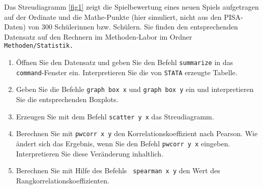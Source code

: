 \documentclass[11pt]{article}
\begin{document}
\begin{enumerate}
Das Streudiagramm \ref{fig1} zeigt die Spielbewertung eines neuen Spiels aufgetragen
auf der Ordinate und die Mathe-Punkte (hier simuliert, nicht aus den PISA-Daten)
von $300$ Schülerinnen bzw. Schülern. Sie finden den entsprechenden Datensatz
auf den Rechnern im Methoden-Labor im Ordner \texttt{Methoden/Statistik.}
 	\begin{enumerate}
 	\item{Öffnen Sie den Datensatz und geben Sie den Befehl \texttt{summarize} in das \texttt{command}-Fenster
 	ein. Interpretieren Sie die von \texttt{STATA} erzeugte Tabelle.}
 	\item{Geben Sie die Befehle \texttt{graph box x} und \texttt{graph box y} ein und interpretieren Sie
 	die entsprechenden Boxplots.}
 	\item{Erzeugen Sie mit dem Befehl \texttt{scatter y x} das Streudiagramm.}
 	\item{Berechnen Sie mit \texttt{pwcorr x y} den Korrelationskoeffizient nach Pearson.
 	Wie ändert sich das Ergebnis, wenn Sie den Befehl \texttt{pwcorr y x} eingeben.
 	Interpretieren Sie diese Veränderung inhaltlich.}
 	\item{Berechnen Sie mit Hilfe des Befehls \texttt{ spearman x y} den Wert des Rangkorrelationskoeffizienten.}
 	\end{enumerate}


\end{enumerate}
\end{document}
